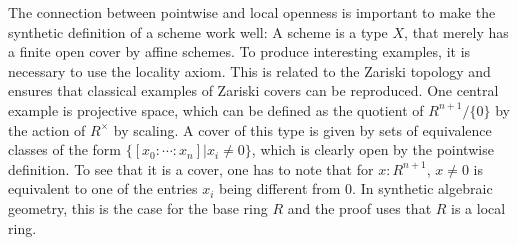 The connection between pointwise and local openness is important to make the synthetic definition of a scheme work well:
A scheme is a type $X$, that merely has a finite open cover by affine schemes.
To produce interesting examples, it is necessary to use the locality axiom.
This is related to the Zariski topology and ensures that classical examples of Zariski covers can be reproduced.
One central example is projective space, which can be defined as the quotient of $R^{n+1}/\{0\}$ by the action of $R^\times$ by scaling.
A cover of this type is given by sets of equivalence classes of the form $\{[x_0:\cdots:x_n] \vert x_i\neq 0 \}$, which is clearly open by the pointwise definition.
To see that it is a cover, one has to note that for $x:R^{n+1}$, $x\neq 0$ is equivalent to one of the entries $x_i$ being different from 0. In synthetic algebraic geometry, this is the case for the base ring $R$ and the proof uses that $R$ is a local ring.
